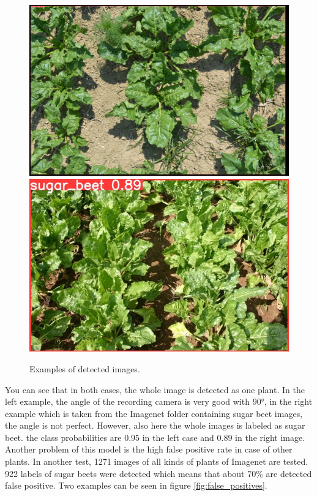 \begin{figure}[htb!]
	\centering
	\includegraphics[scale=0.178]{figures/results_exp1_1.png}
	\includegraphics[scale=0.33]{figures/results_exp1_2.JPEG}
	\caption{Examples of detected images.}
	\label{fig:results_experiment_1}
\end{figure}

You can see that in both cases, the whole image is detected as one plant. In the left example, the angle of the recording camera is very good with $ 90° $, in the right example which is taken from the Imagenet folder containing sugar beet images, the angle is not perfect. However, also here the whole images is labeled as sugar beet. the class probabilities are $ 0.95 $ in the left case and $ 0.89 $ in the right image.\\

Another problem of this model is the high false positive rate in case of other plants. In another test, 1271 images of all kinds of plants of Imagenet are tested. 922 labels of sugar beets were detected which means that about $ 70\% $ are detected false positive. Two examples can be seen in figure \ref{fig:false_positives}.

